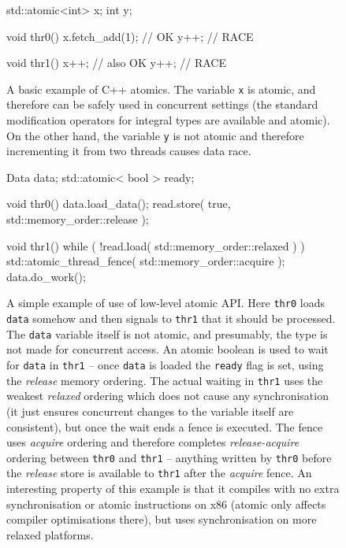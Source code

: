 \begin{figure}[t]
  \begin{cppcode}
    std::atomic<int> x;
    int y;
  \end{cppcode}
  \begin{multicols}{2}
    \begin{cppcode}
      void thr0() {
        x.fetch_add(1); // OK
        y++; // RACE
      }
    \end{cppcode}
    \columnbreak
    \begin{cppcode}
      void thr1() {
        x++; // also OK
        y++; // RACE
      }
    \end{cppcode}
  \end{multicols}
  \vspace{-4ex}
  \caption{A basic example of C++ atomics.
      The variable \texttt{x} is atomic, and therefore can be safely used in
      concurrent settings (the standard modification operators for integral types
      are available and atomic).
      On the other hand, the variable \texttt{y} is not atomic and therefore
      incrementing it from two threads causes data race.
  }\label{fig:prel:cppatomic0}
\end{figure}

\begin{figure}[t]
  \begin{cppcode}
    Data data;
    std::atomic< bool > ready;

    void thr0() {
      data.load_data();
      read.store( true, std::memory_order::release );
    }

    void thr1() {
      while ( !read.load( std::memory_order::relaxed ) )
      { }
      std::atomic_thread_fence( std::memory_order::acquire );
      data.do_work();
    }
  \end{cppcode}
  \vspace{-2ex}
  \caption{A simple example of use of low-level atomic API.
      Here \texttt{thr0} loads \texttt{data} somehow and then signals to
      \texttt{thr1} that it should be processed.
      The \texttt{data} variable itself is not atomic, and presumably, the type
      is not made for concurrent access.
      An atomic boolean is used to wait for \texttt{data} in \texttt{thr1} --
      once \texttt{data} is loaded the \texttt{ready} flag is set, using the
      \emph{release} memory ordering.
      The actual waiting in \texttt{thr1} uses the weakest \emph{relaxed}
      ordering which does not cause any synchronisation (it just ensures
      concurrent changes to the variable itself are consistent), but once the
      wait ends a fence is executed.
      The fence uses \emph{acquire} ordering and therefore completes
      \emph{release-acquire} ordering between \texttt{thr0} and \texttt{thr1}
      -- anything written by \texttt{thr0} before the \emph{release} store is
      available to \texttt{thr1} after the \emph{acquire} fence.
      An interesting property of this example is that it compiles with no extra
      synchronisation or atomic instructions on x86 (atomic only affects
      compiler optimisations there), but uses synchronisation on more relaxed
      platforms.
  }\label{fig:prel:cppatomic1}
\end{figure}

